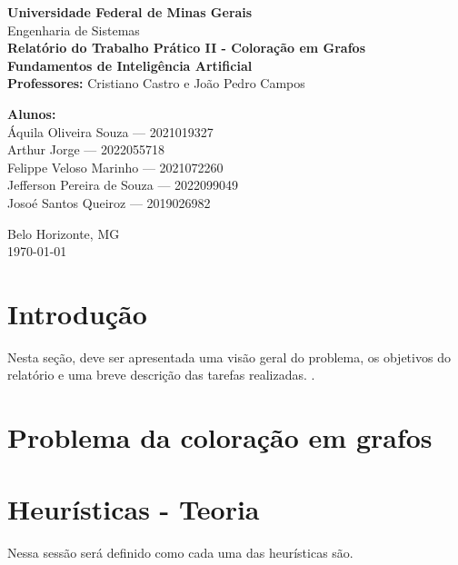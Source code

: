 \documentclass[12pt,a4paper]{article}
\begin{document}
\begin{titlepage}
    \centering
    {\Large \textbf{Universidade Federal de Minas Gerais}}\\[0.3cm]
    {\large Engenharia de Sistemas}\\[2cm]
    
    {\Huge \textbf{Relatório do Trabalho Prático II - Coloração em Grafos}}\\[1.5cm]
    
    \textbf{Fundamentos de Inteligência Artificial}\\[0.5cm]
    \textbf{Professores:} Cristiano Castro e João Pedro Campos\\[1.5cm]
    
    \begin{flushleft}
        \textbf{Alunos:}\\
        Áquila Oliveira Souza --- 2021019327\\
        Arthur Jorge --- 2022055718\\
        Felippe Veloso Marinho --- 2021072260\\
        Jefferson Pereira de Souza --- 2022099049\\
        Josoé Santos Queiroz --- 2019026982
    \end{flushleft}
    
    \vfill
    {\large Belo Horizonte, MG}\\
    {\large \today}
\end{titlepage}

\clearpage
\tableofcontents
\clearpage

\section{Introdução}
Nesta seção, deve ser apresentada uma visão geral do problema, os objetivos do relatório e uma breve descrição das tarefas realizadas. 
\cite{cormen}.

\section{Problema da coloração em grafos}

\section{Heurísticas - Teoria}
Nessa sessão será definido como cada uma das heurísticas são.
\end{document}
